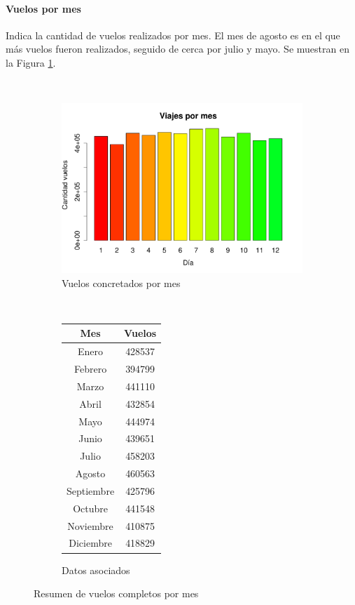 \documentclass[12pt]{article}
\numberwithin{equation}{section}
\numberwithin{table}{section}
\numberwithin{figure}{section}
\begin{document}
\paragraph{Vuelos por mes}
Indica la cantidad de vuelos realizados por mes.
El mes de agosto es en el que más vuelos fueron realizados, seguido de cerca por julio y mayo.
Se muestran en la Figura \ref{fig:concretados-por-mes}.

\begin{figure}
        \centering
        ~
        \begin{subfigure}[b]{0.6\textwidth}
                \includegraphics[width=1\columnwidth]{imagenes/completos/viajes-por-mes}
                \caption{Vuelos concretados por mes}
        \end{subfigure}
        ~
        \begin{subfigure}[b]{0.3\textwidth}
\begin{tabular}{@{}cc@{}}
\toprule
\textbf{Mes} & \textbf{Vuelos} \\ \midrule
Enero        & 428537          \\
Febrero      & 394799          \\
Marzo        & 441110          \\
Abril        & 432854          \\
Mayo         & 444974          \\
Junio        & 439651          \\
Julio        & 458203          \\
Agosto       & 460563          \\
Septiembre   & 425796          \\
Octubre      & 441548          \\
Noviembre    & 410875          \\
Diciembre    & 418829          \\ \bottomrule
\end{tabular}                \caption{Datos asociados}
        \end{subfigure}
        \caption{Resumen de vuelos completos por mes}
        \label{fig:concretados-por-mes}
\end{figure}
\end{document}

